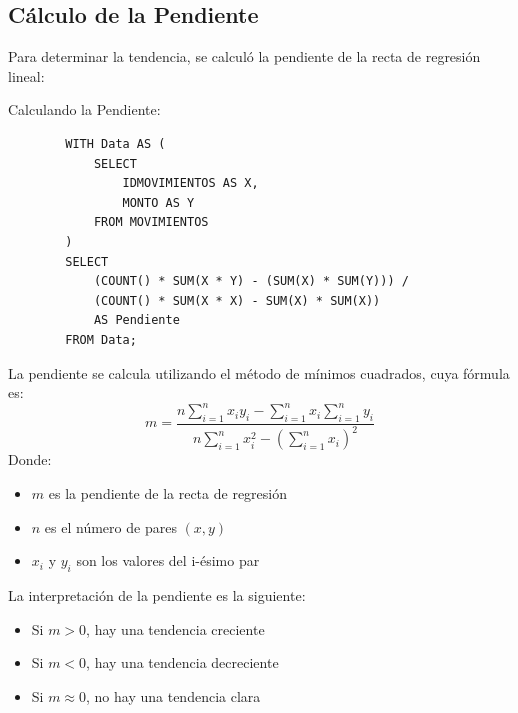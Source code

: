 \subsection{Cálculo de la Pendiente}
Para determinar la tendencia, se calculó la pendiente de la recta de regresión lineal:
\begin{comando}{Calculando la Pendiente:}
	\begin{verbatim}
		WITH Data AS (
			SELECT
				IDMOVIMIENTOS AS X,
				MONTO AS Y
			FROM MOVIMIENTOS
		)
		SELECT
			(COUNT() * SUM(X * Y) - (SUM(X) * SUM(Y))) / 
			(COUNT() * SUM(X * X) - SUM(X) * SUM(X)) 
			AS Pendiente
		FROM Data;
	\end{verbatim}
\end{comando}
La pendiente se calcula utilizando el método de mínimos cuadrados, cuya fórmula es:
\begin{equation}
	m = \frac{n\sum_{i=1}^{n}x_i y_i - \sum_{i=1}^{n}x_i \sum_{i=1}^{n}y_i}{n\sum_{i=1}^{n}x_i^2 - (\sum_{i=1}^{n}x_i)^2}
\end{equation}
Donde:
\begin{itemize}
	\item $m$ es la pendiente de la recta de regresión
	\item $n$ es el número de pares $(x,y)$
	\item $x_i$ y $y_i$ son los valores del i-ésimo par
\end{itemize}
La interpretación de la pendiente es la siguiente:
\begin{itemize}
	\item Si $m > 0$, hay una tendencia creciente
	\item Si $m < 0$, hay una tendencia decreciente
	\item Si $m \approx 0$, no hay una tendencia clara
\end{itemize}
